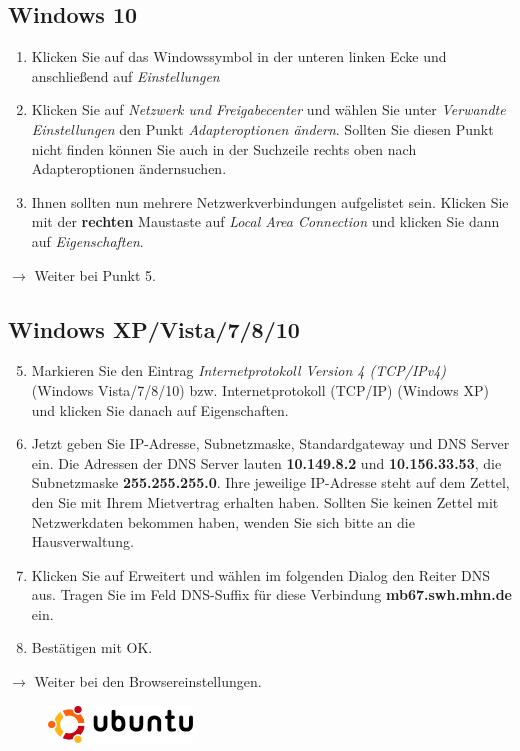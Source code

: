 \documentclass[a4paper,12pt]{scrartcl}
\begin{document}
\subsection*{Windows 10}
\begin{enumerate}
	\item Klicken Sie auf das Windowssymbol in der unteren linken Ecke und anschließend auf \emph{Einstellungen}
	\item Klicken Sie auf \textit{Netzwerk und Freigabecenter} und wählen Sie unter \textit{Verwandte Einstellungen} den Punkt \textit{Adapteroptionen ändern}. Sollten Sie diesen Punkt nicht finden können Sie auch in der Suchzeile rechts oben nach \glqq Adapteroptionen ändern\grqq suchen.
    \item Ihnen sollten nun mehrere Netzwerkverbindungen aufgelistet sein. Klicken Sie mit der \textbf{rechten} Maustaste auf \textit{Local Area Connection} und klicken Sie dann auf \textit{Eigenschaften}.
\end{enumerate}
$\rightarrow$ Weiter bei Punkt 5.

\subsection*{Windows XP/Vista/7/8/10}
\begin{enumerate}
    \setcounter{enumi}{4}
    \item Markieren Sie den Eintrag \textit{Internetprotokoll Version 4 (TCP/IPv4)} (Windows Vista/7/8/10) bzw. Internetprotokoll  (TCP/IP) (Windows XP) und klicken Sie danach auf Eigenschaften.
    \item Jetzt geben Sie IP-Adresse, Subnetzmaske, Standardgateway und DNS Server ein. Die Adressen der DNS Server lauten \textbf{10.149.8.2} und \textbf{10.156.33.53}, die Subnetzmaske \textbf{255.255.255.0}. Ihre jeweilige IP-Adresse steht auf dem Zettel, den Sie mit Ihrem Mietvertrag erhalten haben. Sollten Sie keinen Zettel mit Netzwerkdaten bekommen haben, wenden Sie sich bitte an die Hausverwaltung.
    \item Klicken Sie auf Erweitert und wählen im folgenden Dialog den Reiter DNS aus. Tragen Sie im Feld DNS-Suffix für diese Verbindung \textbf{mb67.swh.mhn.de} ein.
    \item Bestätigen mit OK.
\end{enumerate}
$\rightarrow$ Weiter bei den Browsereinstellungen.



\pagebreak

\begin{figure}[t!]
	\raggedleft
	\vspace{-20pt}
	\includegraphics[height=1cm,keepaspectratio]{Bilder/Ubuntu_logo}
	\vspace{-30pt}
\end{figure}
\end{document}
